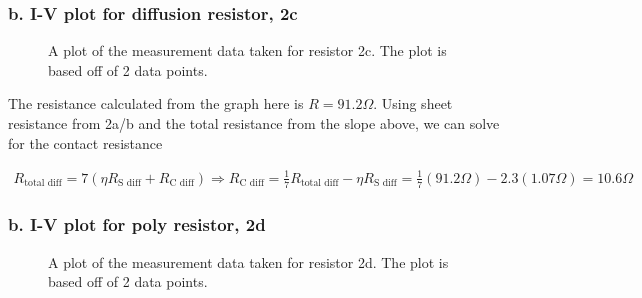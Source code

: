 \documentclass{article}
\begin{document}
\subsubsection{b. I-V plot for diffusion resistor, 2c}
\begin{figure}[H]
\centering
{}
\caption{A plot of the measurement data taken for resistor 2c. The plot is based off of 2 data points.}
\end{figure}

The resistance calculated from the graph here is $R = 91.2 \Omega$. Using sheet resistance from 2a/b and the total resistance from the slope above, we can solve for the contact resistance

\begin{align*}
R_{\text{total diff}} = 7(\eta R_{\text{S diff}} + R_{\text{C diff}}) \Rightarrow R_{\text{C diff}} = \frac{1}{7}R_{\text{total diff}} - \eta R_{\text{S diff}} = \frac{1}{7}(91.2 \Omega) - 2.3(1.07 \Omega) = 10.6 \Omega
\end{align*}



\subsubsection{b. I-V plot for poly resistor, 2d}
\begin{figure}[H]
\centering
{}
\caption{A plot of the measurement data taken for resistor 2d. The plot is based off of 2 data points.}
\end{figure}
\end{document}
